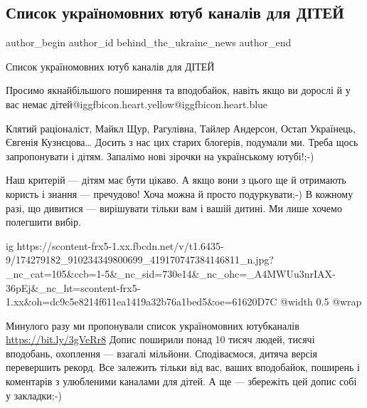  
 
 
 
 
 
\subsection{Список україномовних ютуб каналів для ДІТЕЙ}
\label{sec:17_04_2021.fb.behind_the_ukraine_news.1.youtube_kanaly_deti_mova}
 
\ifcmt
 author_begin
   author_id behind_the_ukraine_news
 author_end
\fi

Список україномовних ютуб каналів для ДІТЕЙ

Просимо якнайбільшого поширення та вподобайок, навіть якщо ви дорослі й у вас
немає дітей@igg{fbicon.heart.yellow}@igg{fbicon.heart.blue}

Клятий раціоналіст, Майкл Щур, Рагулівна, Тайлер Андерсон, Остап Українець,
Євгенія Кузнєцова… Досить з нас цих старих блогерів, подумали ми. Треба щось
запропонувати і дітям. Запалімо нові зірочки на українському ютубі!;-)

Наш критерій — дітям має бути цікаво. А якщо вони з цього ще й отримають
користь і знання — пречудово! Хоча можна й просто подуркувати;-) В кожному
разі, що дивитися — вирішувати тільки вам і вашій дитині. Ми лише хочемо
полегшити вибір.

\ifcmt
  ig https://scontent-frx5-1.xx.fbcdn.net/v/t1.6435-9/174279182_910234349800699_419170747384146811_n.jpg?_nc_cat=105&ccb=1-5&_nc_sid=730e14&_nc_ohc=_A4MWUu3nrIAX-36pEj&_nc_ht=scontent-frx5-1.xx&oh=dc9c5e8214f611ea1419a32b76a1bed5&oe=61620D7C
  @width 0.5
  @wrap \parpic[r]
\fi

Минулого разу ми пропонували список україномовних ютубканалів
\url{https://bit.ly/3gVeRr8} Допис поширили понад 10 тисяч людей, тисячі вподобань,
охоплення — взагалі мільйони. Сподіваємося, дитяча версія перевершить рекорд.
Все залежить тільки від вас, ваших вподобайок, поширень і коментарів з
улюбленими каналами для дітей. А ще — збережіть цей допис собі у закладки;-)

